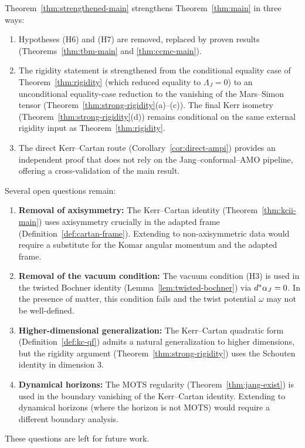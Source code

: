 \begin{remark}
Theorem~\ref{thm:strengthened-main} strengthens Theorem~\ref{thm:main} in three ways:
\begin{enumerate}
    \item Hypotheses (H6) and (H7) are removed, replaced by proven results (Theorems~\ref{thm:tbm-main} and \ref{thm:ccmc-main}).
    \item The rigidity statement is strengthened from the conditional equality case of Theorem~\ref{thm:rigidity} (which reduced equality to $\Lambda_J = 0$) to an unconditional equality-case reduction to the vanishing of the Mars--Simon tensor (Theorem~\ref{thm:strong-rigidity}(a)--(c)). The final Kerr isometry (Theorem~\ref{thm:strong-rigidity}(d)) remains conditional on the same external rigidity input as Theorem~\ref{thm:rigidity}.
    \item The direct Kerr--Cartan route (Corollary~\ref{cor:direct-ampi}) provides an independent proof that does not rely on the Jang--conformal--AMO pipeline, offering a cross-validation of the main result.
\end{enumerate}
\end{remark}

\begin{remark}
Several open questions remain:
\begin{enumerate}
    \item \textbf{Removal of axisymmetry:} The Kerr--Cartan identity (Theorem~\ref{thm:kcii-main}) uses axisymmetry crucially in the adapted frame (Definition~\ref{def:cartan-frame}). Extending to non-axisymmetric data would require a substitute for the Komar angular momentum and the adapted frame.
    \item \textbf{Removal of the vacuum condition:} The vacuum condition (H3) is used in the twisted Bochner identity (Lemma~\ref{lem:twisted-bochner}) via $d^*\alpha_J = 0$. In the presence of matter, this condition fails and the twist potential $\omega$ may not be well-defined.
    \item \textbf{Higher-dimensional generalization:} The Kerr--Cartan quadratic form (Definition~\ref{def:kc-qf}) admits a natural generalization to higher dimensions, but the rigidity argument (Theorem~\ref{thm:strong-rigidity}) uses the Schouten identity in dimension 3.
    \item \textbf{Dynamical horizons:} The MOTS regularity (Theorem~\ref{thm:jang-exist}) is used in the boundary vanishing of the Kerr--Cartan identity. Extending to dynamical horizons (where the horizon is not MOTS) would require a different boundary analysis.
\end{enumerate}
These questions are left for future work.
\end{remark}

